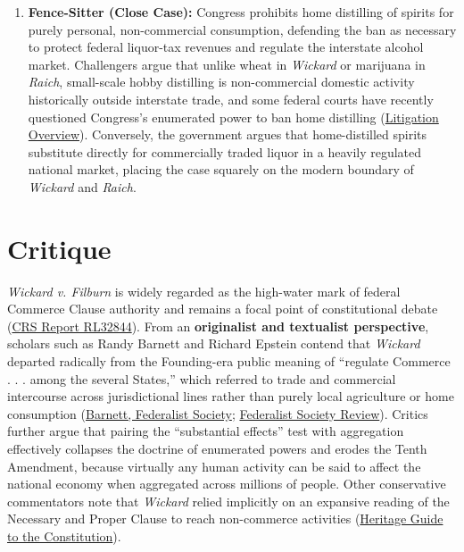 \documentclass[12pt]{article}
\begin{document}
\begin{enumerate}
    \item \textbf{Fence-Sitter (Close Case):} Congress prohibits home distilling of spirits for purely personal, non-commercial consumption, defending the ban as necessary to protect federal liquor-tax revenues and regulate the interstate alcohol market. Challengers argue that unlike wheat in \textit{Wickard} or marijuana in \textit{Raich}, small-scale hobby distilling is non-commercial domestic activity historically outside interstate trade, and some federal courts have recently questioned Congress's enumerated power to ban home distilling (\href{https://alec.org/wp-content/uploads/2026/08/ALEC-AAF-LJC-26-93-Ream-Brief.pdf}{Litigation Overview}). Conversely, the government argues that home-distilled spirits substitute directly for commercially traded liquor in a heavily regulated national market, placing the case squarely on the modern boundary of \textit{Wickard} and \textit{Raich}.
\end{enumerate}

\section{Critique}

\textit{Wickard v. Filburn} is widely regarded as the high-water mark of federal Commerce Clause authority and remains a focal point of constitutional debate (\href{https://www.everycrsreport.com/reports/RL32844.html}{CRS Report RL32844}). From an \textbf{originalist and textualist perspective}, scholars such as Randy Barnett and Richard Epstein contend that \textit{Wickard} departed radically from the Founding-era public meaning of ``regulate Commerce . . . among the several States,'' which referred to trade and commercial intercourse across jurisdictional lines rather than purely local agriculture or home consumption (\href{https://fedsoc.org/commentary/videos/wickard-v-filburn-the-aggregation-principle-congressional-power-no-86}{Barnett, Federalist Society}; \href{https://fedsoc.org/fedsoc-review/the-meaning-of-regulate-commerce-to-the-constitution-s-ratifiers}{Federalist Society Review}). Critics further argue that pairing the ``substantial effects'' test with aggregation effectively collapses the doctrine of enumerated powers and erodes the Tenth Amendment, because virtually any human activity can be said to affect the national economy when aggregated across millions of people. Other conservative commentators note that \textit{Wickard} relied implicitly on an expansive reading of the Necessary and Proper Clause to reach non-commerce activities (\href{https://constitution.heritage.org/essays/a1-s8-c3-b/}{Heritage Guide to the Constitution}).
\end{document}
